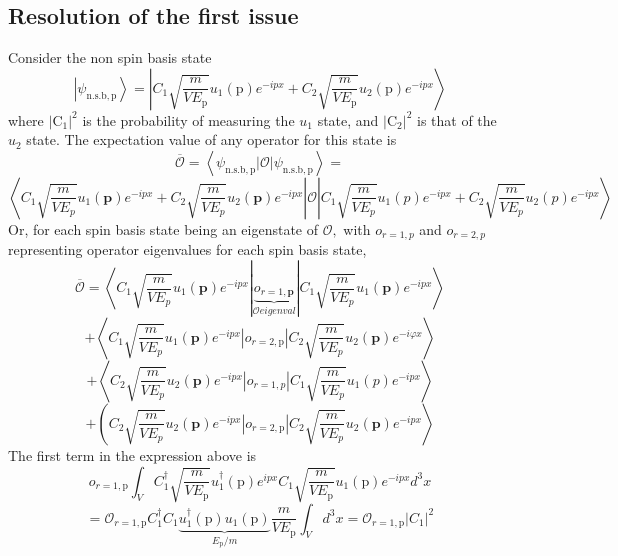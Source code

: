 \subsection{Resolution of the first issue}
Consider the non spin basis state
\begin{equation}
\left|\psi_{\mathrm{n.s.b}, \mathrm{p}}\right\rangle=\left|C_{1} \sqrt{\frac{m}{V E_{\mathrm{p}}}} u_{1}(\mathrm{p}) e^{-i p x}+C_{2} \sqrt{\frac{m}{V E_{\mathrm{p}}}} u_{2}(\mathrm{p}) e^{-i p x}\right\rangle
\end{equation}
where $\left|\mathrm{C}_{1}\right|^{2}$ is the probability of measuring the $u_{1}$ state, and $\left|\mathrm{C}_{2}\right|^{2}$ is that of the $u_{2}$ state. The expectation value of any operator for this state is
$$
\overline{\mathcal{O}}=\left\langle\psi_{\mathrm{n} . \mathrm{s.} \mathrm{b}, \mathrm{p}}|\mathcal{O}| \psi_{\mathrm{n}. \mathrm{s} . \mathrm{b} , \mathrm{p}}\right\rangle=
$$
$$
\left\langle C_{1} \sqrt{\frac{m}{V E_{p}}} u_{1}(\mathbf{p}) e^{-i p x}+C_{2} \sqrt{\frac{m}{V E_{p}}} u_{2}(\mathbf{p}) e^{-i p x}\right|\mathcal{O} \left| C_{1} \sqrt{\frac{m}{V E_{p}}} u_{1}(p) e^{-i p x}+C_{2} \sqrt{\frac{m}{V E_{p}}} u_{2}(p) e^{-i p x}\right\rangle
$$
Or, for each spin basis state being an eigenstate of $\mathcal{O},$ with $o_{r=1, p}$ and $o_{r=2, p}$ representing operator eigenvalues for each spin basis state,
$$
\overline{\mathcal{O}}=\left\langle C_{1} \sqrt{\frac{m}{V E_{p}}} u_{1}(\mathbf{p}) e^{-i p x}|\underbrace{o_{r=1, \mathbf{p}}}_{\mathcal{O} eigenval}| C_{1} \sqrt{\frac{m}{V E_{p}}} u_{1}(\mathbf{p}) e^{-i p x}\right\rangle
$$
$$
+
\left\langle C_{1} \sqrt{\frac{m}{V E_{p}}} u_{1}(\mathbf{p}) e^{-i p x}\left|o_{r=2, \mathrm{p}}\right| C_{2} \sqrt{\frac{m}{V E_{p}}} u_{2}(\mathbf{p}) e^{-i \varphi x}\right\rangle
$$
$$
+\left\langle C_{2} \sqrt{\frac{m}{V E_{p}}} u_{2}(\mathbf{p}) e^{-i p x}\left|o_{r=1, p}\right| C_{1} \sqrt{\frac{m}{V E_{p}}} u_{1}(p) e^{-i p x}\right\rangle
$$
$$+\left(C_{2} \sqrt{\frac{m}{V E_{p}}} u_{2}(\mathbf{p}) e^{-i p x}\left|o_{r=2, \mathrm{p}}\right| C_{2} \sqrt{\frac{m}{V E_{p}}} u_{2}(\mathbf{p}) e^{-i p x}\right\rangle
$$
The first term in the expression above is
$$
o_{r=1, \mathrm{p}} \int_{V} C_{1}^{\dagger} \sqrt{\frac{m}{V E_{\mathrm{p}}}} u_{1}^{\dagger}(\mathrm{p}) e^{i p x} C_{1} \sqrt{\frac{m}{V E_{\mathrm{p}}}} u_{1}(\mathrm{p}) e^{-i p x} d^{3} x
$$
$$
=\mathcal{O}_{r=1, \mathrm{p}} C_{1}^{\dagger} C_{1} \underbrace{u_{1}^{\dagger}(\mathrm{p}) u_{1}(\mathrm{p})}_{E_{\mathrm{p}} / m} \frac{m}{V E_{\mathrm{p}}} \int_{V} d^{3} x=\mathcal{O}_{r=1, \mathrm{p}}\left|C_{1}\right|^{2}
$$
